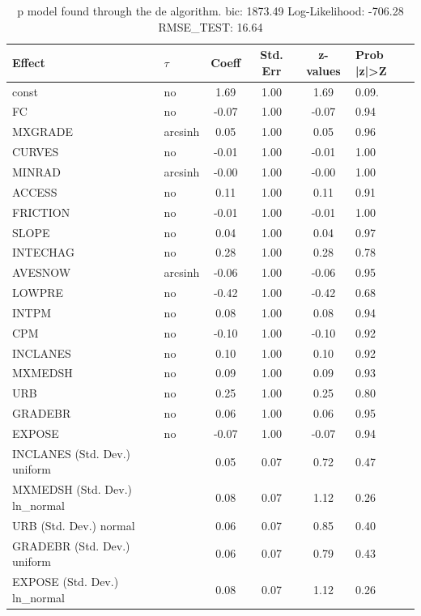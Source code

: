 \begin{table}
	\caption{p model found through the de algorithm. bic: 1873.49 Log-Likelihood: -706.28 RMSE_TEST: 16.64}
	\begin{center}
		\begin{tabular}{|l|l|c|c|c|l|}
			\hline
			Effect & $\tau$ & Coeff & Std. Err & z-values & Prob |z|>Z \\
			\hline
			const & no & 1.69 & 1.00 & 1.69 & 0.09. \\
			\hline
			FC & no & -0.07 & 1.00 & -0.07 & 0.94 \\
			\hline
			MXGRADE & arcsinh & 0.05 & 1.00 & 0.05 & 0.96 \\
			\hline
			CURVES & no & -0.01 & 1.00 & -0.01 & 1.00 \\
			\hline
			MINRAD & arcsinh & -0.00 & 1.00 & -0.00 & 1.00 \\
			\hline
			ACCESS & no & 0.11 & 1.00 & 0.11 & 0.91 \\
			\hline
			FRICTION & no & -0.01 & 1.00 & -0.01 & 1.00 \\
			\hline
			SLOPE & no & 0.04 & 1.00 & 0.04 & 0.97 \\
			\hline
			INTECHAG & no & 0.28 & 1.00 & 0.28 & 0.78 \\
			\hline
			AVESNOW & arcsinh & -0.06 & 1.00 & -0.06 & 0.95 \\
			\hline
			LOWPRE & no & -0.42 & 1.00 & -0.42 & 0.68 \\
			\hline
			INTPM & no & 0.08 & 1.00 & 0.08 & 0.94 \\
			\hline
			CPM & no & -0.10 & 1.00 & -0.10 & 0.92 \\
			\hline
			INCLANES & no & 0.10 & 1.00 & 0.10 & 0.92 \\
			\hline
			MXMEDSH & no & 0.09 & 1.00 & 0.09 & 0.93 \\
			\hline
			URB & no & 0.25 & 1.00 & 0.25 & 0.80 \\
			\hline
			GRADEBR & no & 0.06 & 1.00 & 0.06 & 0.95 \\
			\hline
			EXPOSE & no & -0.07 & 1.00 & -0.07 & 0.94 \\
			\hline
			INCLANES (Std. Dev.) uniform &  & 0.05 & 0.07 & 0.72 & 0.47 \\
			\hline
			MXMEDSH (Std. Dev.) ln_normal &  & 0.08 & 0.07 & 1.12 & 0.26 \\
			\hline
			URB (Std. Dev.) normal &  & 0.06 & 0.07 & 0.85 & 0.40 \\
			\hline
			GRADEBR (Std. Dev.) uniform &  & 0.06 & 0.07 & 0.79 & 0.43 \\
			\hline
			EXPOSE (Std. Dev.) ln_normal &  & 0.08 & 0.07 & 1.12 & 0.26 \\
			\hline
		\end{tabular}
	\end{center}
\end{table}